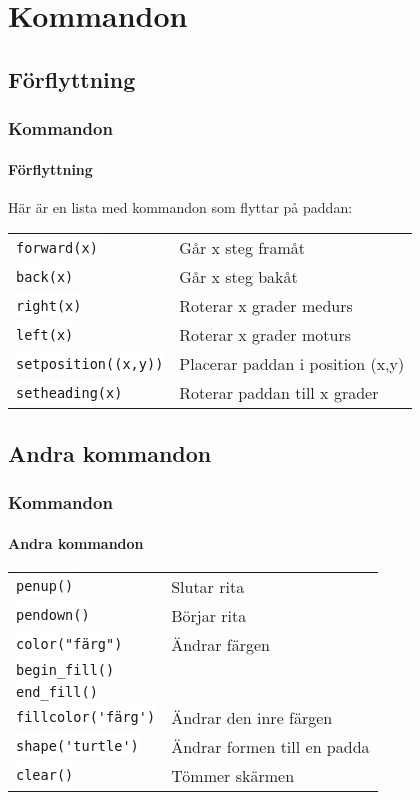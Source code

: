 \documentclass[aspectratio=169]{beamer}
\newcommand{\code}[1]{\colorbox{white}{\lstinline{#1}}}
\begin{document}
\section{Kommandon}

\subsection{Förflyttning}

\begin{frame}
	\frametitle{Kommandon}
	\framesubtitle{Förflyttning}
	
	Här är en lista med kommandon som flyttar på paddan:
	
	\begin{tabular}{ll}
		\code{forward(x)} & Går x steg framåt\\
		\code{back(x)} & Går x steg bakåt\\
		\code{right(x)} & Roterar x grader medurs\\
		\code{left(x)} & Roterar x grader moturs\\
		\code{setposition((x,y))} & Placerar paddan i position (x,y)\\
		\code{setheading(x)} & Roterar paddan till x grader
	\end{tabular}
	
\end{frame}

\subsection{Andra kommandon}

\begin{frame}
	\frametitle{Kommandon}
	\framesubtitle{Andra kommandon}
	
	\begin{tabular}{ll}
		\code{penup()} & Slutar rita\\
		\code{pendown()} & Börjar rita\\
		\code{color("färg")} & Ändrar färgen\\
		\code{begin_fill()} & \\
		\code{end_fill()} & \\
		\code{fillcolor('färg')} & Ändrar den inre färgen\\
		\code{shape('turtle')} & Ändrar formen till en padda\\
		\code{clear()} & Tömmer skärmen
	\end{tabular}
	
\end{frame}
\end{document}
